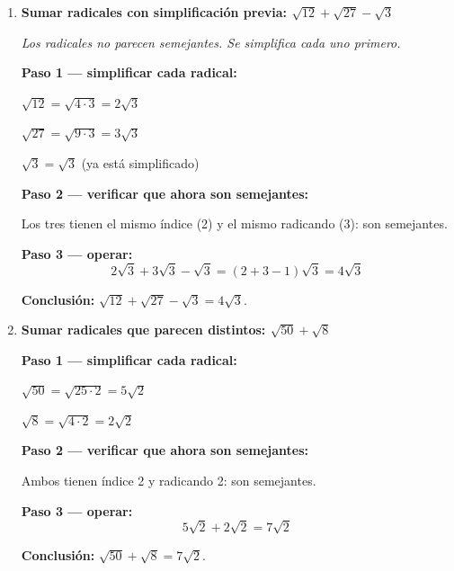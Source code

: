 \documentclass[11pt, letterpaper]{article}
\begin{document}
\begin{tcolorbox}[examplebox, title={Ejemplos}]
\begin{enumerate}[label=\textbf{Ej. \arabic*.}, leftmargin=*, itemsep=18pt]
Los radicales $5\sqrt{3}$ y $-2\sqrt{3}$ son semejantes (mismo radicando 3, mismo índice 2). Los radicales $-3\sqrt{2}$ y $7\sqrt{2}$ también son semejantes (radicando 2, índice 2).

\textbf{Paso 2 — operar cada grupo:}
$$5\sqrt{3} - 2\sqrt{3} = (5-2)\sqrt{3} = 3\sqrt{3}$$
$$-3\sqrt{2} + 7\sqrt{2} = (-3+7)\sqrt{2} = 4\sqrt{2}$$

\textbf{Conclusión:} $5\sqrt{3} - 3\sqrt{2} - 2\sqrt{3} + 7\sqrt{2} = 3\sqrt{3} + 4\sqrt{2}$.

\item \textbf{Sumar radicales con simplificación previa: $\sqrt{12} + \sqrt{27} - \sqrt{3}$}

\textit{Los radicales no parecen semejantes. Se simplifica cada uno primero.}

\textbf{Paso 1 — simplificar cada radical:}

$\sqrt{12} = \sqrt{4 \cdot 3} = 2\sqrt{3}$

$\sqrt{27} = \sqrt{9 \cdot 3} = 3\sqrt{3}$

$\sqrt{3} = \sqrt{3}$ \quad (ya está simplificado)

\textbf{Paso 2 — verificar que ahora son semejantes:}

Los tres tienen el mismo índice (2) y el mismo radicando (3): son semejantes.

\textbf{Paso 3 — operar:}
$$2\sqrt{3} + 3\sqrt{3} - \sqrt{3} = (2 + 3 - 1)\sqrt{3} = 4\sqrt{3}$$

\textbf{Conclusión:} $\sqrt{12} + \sqrt{27} - \sqrt{3} = 4\sqrt{3}$.

\item \textbf{Sumar radicales que parecen distintos: $\sqrt{50} + \sqrt{8}$}

\textbf{Paso 1 — simplificar cada radical:}

$\sqrt{50} = \sqrt{25 \cdot 2} = 5\sqrt{2}$

$\sqrt{8} = \sqrt{4 \cdot 2} = 2\sqrt{2}$

\textbf{Paso 2 — verificar que ahora son semejantes:}

Ambos tienen índice 2 y radicando 2: son semejantes.

\textbf{Paso 3 — operar:}
$$5\sqrt{2} + 2\sqrt{2} = 7\sqrt{2}$$

\textbf{Conclusión:} $\sqrt{50} + \sqrt{8} = 7\sqrt{2}$.

\end{enumerate}
\end{tcolorbox}
\end{document}
